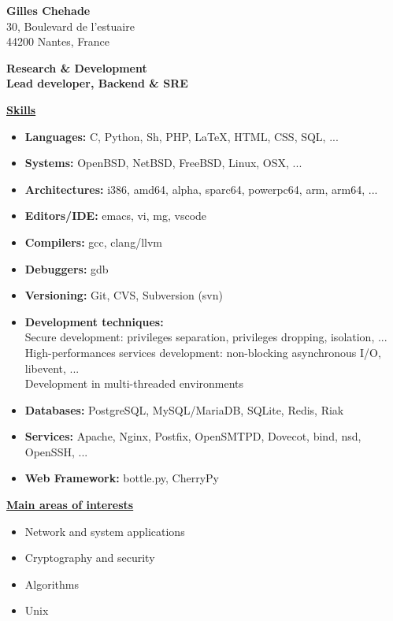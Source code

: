 \documentclass[a4paper,10pt]{letter}
\begin{document}
\textbf{Gilles Chehade}\\
30, Boulevard de l'estuaire\\
44200 Nantes, France\\

\begin{center}
  \large
  \textbf {
    Research \& Development\\
    Lead developer, Backend \& SRE\\
  }
\end{center}

\normalsize

\underline{\textbf{Skills}}\\
\begin{itemize}
\item	\textbf{Languages:}
  C, Python, Sh, PHP, \LaTeX, HTML, CSS, SQL, ...
\item	\textbf{Systems:}
  OpenBSD, NetBSD, FreeBSD, Linux, OSX, ...
\item	\textbf{Architectures:}
  i386, amd64, alpha, sparc64, powerpc64, arm, arm64, ...
\item	\textbf{Editors/IDE:}
  emacs, vi, mg, vscode
\item	\textbf{Compilers:}
  gcc, clang/llvm
\item	\textbf{Debuggers:}
  gdb
\item	\textbf{Versioning:}
  Git, CVS, Subversion (svn)
\item	\textbf{Development techniques:}\\
  Secure development:
  privileges separation, privileges dropping, isolation, ...\\
  High-performances services development:
  non-blocking asynchronous I/O, libevent, ...\\
  Development in multi-threaded environments

\item	\textbf{Databases:}
  PostgreSQL, MySQL/MariaDB, SQLite, Redis, Riak
\item	\textbf{Services:}
  Apache, Nginx, Postfix, OpenSMTPD, Dovecot, bind, nsd, OpenSSH, ...
\item	\textbf{Web Framework:}
  bottle.py, CherryPy\\
\end{itemize}

\underline{\textbf{Main areas of interests}}\\
\begin{itemize}
\item Network and system applications
\item Cryptography and security
\item Algorithms
\item Unix\\
\end{itemize}
\end{document}
